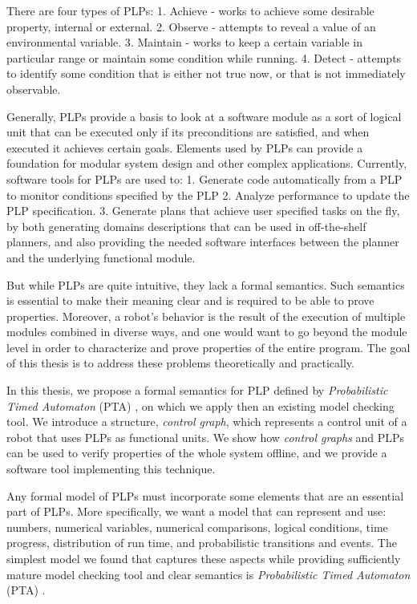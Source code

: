 \par There are four types of PLPs: 1. Achieve - works to achieve some desirable property, internal or external. 2. Observe - attempts to reveal a value of an environmental variable. 3. Maintain - works to keep a certain variable in particular range or maintain some condition while running. 4. Detect - attempts to identify some condition that is either not true now, or that is not immediately observable. 
\par Generally, PLPs provide a basis to look at a software module as a sort of logical unit that can be executed only if its preconditions are satisfied, and when executed it achieves certain goals. Elements used by PLPs can provide a foundation for modular system design and other complex applications. Currently, software tools for PLPs \cite{brafman2016performance} are used to: 1. Generate code automatically from a PLP to monitor conditions specified by the PLP 2. Analyze performance to update the PLP specification. 3. Generate plans that achieve user specified tasks on the fly, by both generating domains descriptions that can be used in off-the-shelf planners, and also providing the needed software interfaces between the planner and the underlying functional module.
\par But while PLPs are quite intuitive, they lack a formal semantics. Such semantics is essential to make their meaning clear and is required to be able to prove properties. Moreover, a robot’s behavior is the result of the execution of multiple modules combined in diverse ways, and one would want to go beyond the module level in order to characterize and prove properties of the entire program. The goal of this thesis is to address these problems theoretically and practically. 
\par In this thesis, we propose a formal semantics for PLP defined by \textit{Probabilistic Timed Automaton} (PTA) \cite{norman2013model}, on which we apply then an existing model checking tool. We introduce a structure, \textit{control graph}, which represents a control unit of a robot that uses PLPs as functional units. We show how \textit{control graphs} and PLPs can be used to verify properties of the whole system offline, and we provide a software tool implementing this technique.
\par Any formal model of PLPs must incorporate some elements that are an essential part of PLPs. More specifically, we want a model that can represent and use: numbers, numerical variables, numerical comparisons, logical conditions, time progress, distribution of run time, and probabilistic transitions and events. The simplest model we found that captures these aspects while providing sufficiently mature model checking tool and clear semantics is \textit{Probabilistic Timed Automaton} (PTA) \cite{norman2013model}.
